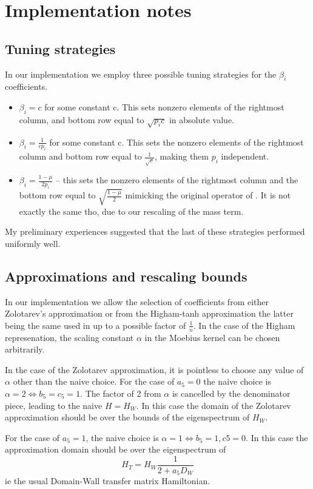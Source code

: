 \documentclass[12pt]{article}
\begin{document}
\section{Implementation notes}
\subsection{Tuning strategies}
In our implementation we employ three possible tuning strategies for
the $\beta_i$ coefficients.
\begin{itemize}
\item
$\beta_i=c$ for some constant c. This sets nonzero elements of the
rightmost column, and bottom row equal to $\sqrt{p_i c}$ in absolute value.
\item 
$\beta_i=\frac{1}{c p_i}$ for some constant c. This sets the nonzero
elements of the rightmost column and bottom row equal to $ \frac{1}{\sqrt{c}}$,
making them $p_i$ independent.
\item
$\beta_i=\frac{1-\mu}{2 p_i}$ -- this sets the nonzero elements of the 
rightmost column and the bottom row equal to $\sqrt{\frac{1-\mu}{2}}$ 
mimicking the original operator of \cite{NeubergerNarayanan}. It is
not exactly the same tho, due to our rescaling of the mass term.
\end{itemize}

My preliminary experiences suggested that the last of these strategies
performed uniformly well.

\subsection{Approximations and rescaling bounds}
In our implementation we allow the selection of coefficients from either
Zolotarev's approximation or from the Higham-tanh approximation the 
latter being the same used in \cite{NeubergerNarayanan} up to a possible
factor of $\frac{1}{n}$. In the case of the Higham represenation, the 
scaling constant $\alpha$ in the Moebius kernel can be chosen arbitrarily.

In the case of the Zolotarev approximation, it is pointless to choose
any value of $\alpha$ other than the naive choice. For the case of 
$a_5=0$ the naive choice is $\alpha=2 \iff b_5=c_5=1$. The factor
of 2 from $\alpha$ is cancelled by the denominator piece, leading
to the naive $H=H_W$. In this case the domain of the Zolotarev
approximation should be over the bounds of the eigenspectrum of $H_W$.

For the case of $a_5 = 1$, the naive choice is $\alpha=1 \iff b_5 =1, c5=0$.
In this case the approximation domain should be over the eigenspectrum
of 
$$
H_T = H_W \frac{ 1 }{2 + a_5 D_W}
$$
ie the usual Domain-Wall transfer matrix Hamiltonian.
\end{document}

